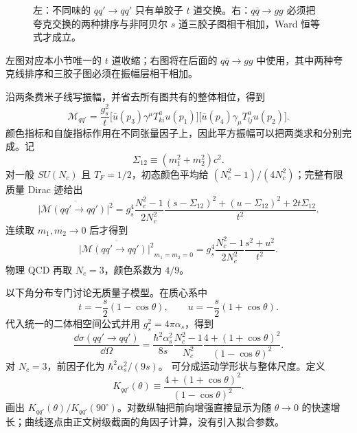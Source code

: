 \begin{figure}[htbp]
 \centering
 
 \caption{左：不同味的 $qq'\to qq'$ 只有单胶子 $t$ 道交换。右：$q\bar q\to gg$ 必须把夸克交换的两种排序与非阿贝尔 $s$ 道三胶子图相干相加，Ward 恒等式才成立。}
 \label{fig:qcd-tree-processes-dp10}
\end{figure}

 左图对应本小节唯一的 $t$ 道收缩；右图将在后面的 $q\bar q\to gg$ 中使用，其中两种夸克线排序和三胶子图必须在振幅层相干相加。

沿两条费米子线写振幅，并省去所有图共有的整体相位，得到
\begin{equation}
 \boxed{
 \mathcal M_{qq'}
 =\frac{g_s^2}{t}
 \bigl[\bar u(p_3)\gamma^\mu T^a_{ki}u(p_1)\bigr]
 \bigl[\bar u(p_4)\gamma_\mu T^a_{lj}u(p_2)\bigr].}
 \label{eq:qqprime-amplitude-dp10}
\end{equation}
颜色指标和自旋指标作用在不同张量因子上，因此平方振幅可以把两类求和分别完成。记
\begin{equation*}
 \Sigma_{12}\equiv(m_1^2+m_2^2)c^2 .
\end{equation*}
对一般 $SU(N_c)$ 且 $T_F=1/2$，初态颜色平均给 $(N_c^2-1)/(4N_c^2)$；完整有限质量 Dirac 迹给出
\begin{equation}
 \boxed{
 \overline{|\mathcal M(qq'\to qq')|^2}
 =g_s^4\frac{N_c^2-1}{2N_c^2}
 \frac{(s-\Sigma_{12})^2+(u-\Sigma_{12})^2+2t\Sigma_{12}}{t^2}.}
 \label{eq:qqprime-M2-massive-dp115}
\end{equation}
连续取 $m_1,m_2\to0$ 后才得到
\begin{equation}
 \boxed{
 \overline{|\mathcal M(qq'\to qq')|^2}_{m_1=m_2=0}
 =g_s^4\frac{N_c^2-1}{2N_c^2}
 \frac{s^2+u^2}{t^2}.}
 \label{eq:qqprime-M2-final-dp10}
\end{equation}
物理 QCD 再取 $N_c=3$，颜色系数为 $4/9$。

以下角分布专门讨论无质量子模型。在质心系中
\begin{equation*}
 t=-\frac s2(1-\cos\theta),
 \qquad
 u=-\frac s2(1+\cos\theta).
\end{equation*}
代入统一的二体相空间公式并用 $g_s^2=4\pi\alpha_s$，得到
\begin{equation}
 \boxed{
 \frac{\dd\sigma(qq'\to qq')}{\dd\Omega}
 =\frac{\hbar^2\alpha_s^2}{8s}
 \frac{N_c^2-1}{N_c^2}
 \frac{4+(1+\cos\theta)^2}{(1-\cos\theta)^2}.}
 \label{eq:qqprime-angular-cross-section-dp10}
\end{equation}
对 $N_c=3$，前因子化为 $\hbar^2\alpha_s^2/(9s)$。 可分成运动学形状与整体尺度。定义
\begin{equation}
 K_{qq'}(\theta)
 \equiv
 \frac{4+(1+\cos\theta)^2}{(1-\cos\theta)^2}.
 \label{eq:qcd-qqprime-angular-kernel-dp68}
\end{equation}
 画出 $K_{qq'}(\theta)/K_{qq'}(90^\circ)$。对数纵轴把前向增强直接显示为随 $\theta\to0$ 的快速增长；曲线逐点由正文树级截面的角因子计算，没有引入拟合参数。

